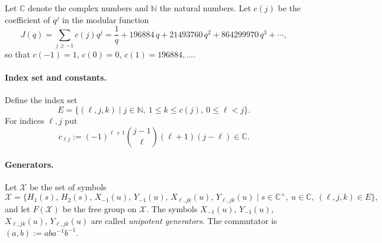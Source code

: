 \documentclass[11pt]{article}
\theoremstyle{definition}
\theoremstyle{remark}
\newcommand{\Cx}{\mathbb{C}^{\times}}
\begin{document}
Let $\mathbb{C}$ denote the complex numbers and $\mathbb{N}$ the natural numbers. Let $c(j)$ be the coefficient of $q^j$ in the modular function
\[
J(q)=\sum_{j\geq -1}c(j)q^j=\frac{1}{q}+196884\,q+21493760\,q^2+864299970\,q^3+\cdots,
\]
so that $c(-1)=1$, $c(0)=0$, $c(1)=196884,\dots$.

\paragraph{Index set and constants.} Define the index set
\[
E=\{(\ell,j,k)\mid j\in\mathbb{N},\ 1\leq k\leq c(j),\ 0\leq \ell<j\}.
\]
For indices $\ell,j$ put
\[
c_{\ell j}:=(-1)^{\ell+1}\binom{j-1}{\ell}(\ell+1)(j-\ell)\in\mathbb{C}.
\]

\paragraph{Generators.} Let $\mathcal{X}$ be the set of symbols
\[
\mathcal{X}=\{H_1(s),\,H_2(s),\,X_{-1}(u),\,Y_{-1}(u),\,X_{\ell,jk}(u),\,Y_{\ell,jk}(u)\mid s\in\Cx,\ u\in\mathbb{C},\ (\ell,j,k)\in E\},
\]
and let $F(\mathcal{X})$ be the free group on $\mathcal{X}$. The symbols $X_{-1}(u)$, $Y_{-1}(u)$, $X_{\ell,jk}(u)$, $Y_{\ell,jk}(u)$ are called \emph{unipotent generators}. The commutator is $(a,b):=aba^{-1}b^{-1}$.
\end{document}
